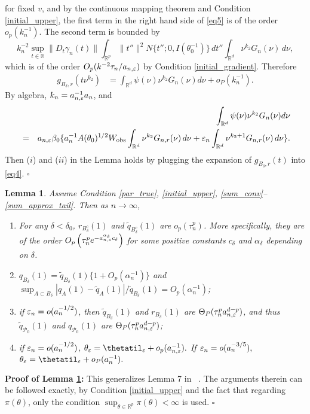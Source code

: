 \documentclass{article}
\newtheorem{lemma}{Lemma}
\begin{document}
	for fixed $v$, and by the continuous mapping theorem and Condition \ref{initial_upper}, the
	first term in the right hand side of \eqref{eq5} is of the order
	$o_{p}(k_{n}^{-1})$. The second term is bounded by 
	\[
	k_{n}^{-2}\sup_{t\in\mathbb{R}}\|D_{t}\gamma_{n}(t)\|\int_{\mathbb{R}^{p}}\|t''\|^{2}N\{t'';0,I(\theta_{0}^{-1})\}\,dt''\int_{\mathbb{R}^{d}}\nu^{k_{2}}G_{n}(\nu)\,d\nu,
	\]
	which is of the order $O_{p}(k^{-2}\tau_{n}/a_{n,\varepsilon})$ by Condition \ref{initial_gradient}.
	Therefore 
	\begin{align}
	g_{B_{\delta},r}(t\nu^{k_{2}}) & =\int_{\mathbb{R}^{d}}\psi(\nu)\nu^{k_{2}}G_{n}(\nu)d\nu+o_{P}(k_{n}^{-1}).\label{eq6}
	\end{align}
	By algebra, $k_{n}=a_{n,\varepsilon}^{-1}a_{n}$, and 
	\begin{eqnarray}
	&  & \int_{\mathbb{R}^{d}}\psi(\nu)\nu^{k_{2}}G_{n}(\nu)d\nu\nonumber \\
	& = & a_{n,\varepsilon}\beta_{0}\{a_{n}^{-1}A(\theta_{0})^{1/2}W_{\rm obs}\int_{\mathbb{R}^{d}}\nu^{k_{2}}G_{n,r}(\nu)\,d\nu+\varepsilon_{n}\int_{\mathbb{R}^{d}}\nu^{k_{2}+1}G_{n,r}(\nu)\,d\nu\}.\label{eq7}
	\end{eqnarray}
	Then ($i$) and ($ii$) in the Lemma holds by plugging the expansion
	of $g_{B_{\delta},r}(t)$ into \eqref{eq4}.
	\hfill{$\square$} 
	
\begin{lemma}\label{Alemma3.5} Assume Condition \ref{par_true}, \ref{initial_upper}, \ref{sum_conv}--\ref{sum_approx_tail}. Then as $n\rightarrow\infty$, 
	\begin{enumerate}
		\item[(i)] For any $\delta<\delta_{0}$, $r_{B_{\delta}^{c}}(1)$ and $\tilde{q}_{B_{\delta}^{c}}(1)$
		are $o_{p}(\tau_{n}^{p})$. More specifically, they are of the order
		$O_{p}\left(\tau_{n}^{p}e^{-a_{n,\varepsilon}^{\alpha_{\delta}}c_{\delta}}\right)$
		for some positive constants $c_{\delta}$ and $\alpha_{\delta}$ depending
		on $\delta$.
		\item[(ii)] $q_{B_{\delta}}(1)=\tilde{q}_{B_{\delta}}(1)\{1+O_{p}(\alpha_{n}^{-1})\}$
		and $\sup_{A\subset B_{\delta}}|q_{A}(1)-\tilde{q}_{A}(1)|/\tilde{q}_{B_{\delta}}(1)=O_{p}(\alpha_{n}^{-1})$; 
		\item[(iii)] if $\varepsilon_{n}=o(a_{n}^{-1/2})$, then $\tilde{q}_{B_{\delta}}(1)$ and
		$r_{B_{\delta}}(1)$ are $\Theta_{P}(\tau_{n}^{p}a_{n,\varepsilon}^{d-p})$,
		and thus $\tilde{q}_{\mathcal{P}_{0}}(1)$ and $q_{\mathcal{P}_{0}}(1)$
		are $\Theta_{P}(\tau_{n}^{p}a_{n,\varepsilon}^{d-p})$; 
		\item[(iv)] if $\varepsilon_{n}=o(a_{n}^{-1/2})$, $\theta_{\veps}=\thetatil_{\veps}+o_{p}(a_{n,\veps}^{-1}).$
		If $\varepsilon_{n}=o(a_{n}^{-3/5}),$ $\theta_{\veps}=\thetatil_{\veps}+o_{P}(a_{n}^{-1}).$
	\end{enumerate} \end{lemma}
{\bf Proof of Lemma \ref{Alemma3.5}:} 
	This generalizes Lemma 7 in ~\cite{Li2017}. The arguments therein
	can be followed exactly, by Condition \ref{initial_upper} and the fact that regarding $\pi(\theta)$,
	only the condition $\sup_{\theta\in\mathbb{R}^{p}}\pi(\theta)<\infty$
	is used.
	\hfill{$\square$} 
	
\end{document}
